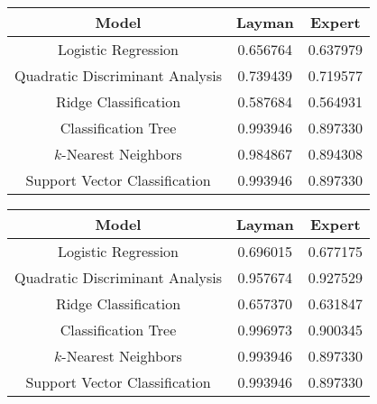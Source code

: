 \documentclass{article}
\begin{document}
\begin{table}[p]
\centering
\color{DarkBlue}
\begin{tabular}{|c|c|c|}
\hline
\textbf{Model}                  & \textbf{Layman} & \textbf{Expert} \\
\hline
Logistic Regression             & 0.656764        & 0.637979 \\
Quadratic Discriminant Analysis & 0.739439        & 0.719577 \\
Ridge Classification            & 0.587684        & 0.564931 \\
Classification Tree             & 0.993946        & 0.897330 \\
$k$-Nearest Neighbors           & 0.984867        & 0.894308 \\
Support Vector Classification   & 0.993946        & 0.897330 \\
\hline
\end{tabular}
\end{table}

\begin{table}[p]
\centering
\color{DarkBlue}
\begin{tabular}{|c|c|c|}
\hline
\textbf{Model}                  & \textbf{Layman} & \textbf{Expert} \\
\hline
Logistic Regression             & 0.696015        & 0.677175        \\
Quadratic Discriminant Analysis & 0.957674        & 0.927529        \\
Ridge Classification            & 0.657370        & 0.631847        \\
Classification Tree             & 0.996973        & 0.900345        \\
$k$-Nearest Neighbors           & 0.993946        & 0.897330        \\
Support Vector Classification   & 0.993946        & 0.897330        \\
\hline
\end{tabular}
\end{table}
\end{document}
